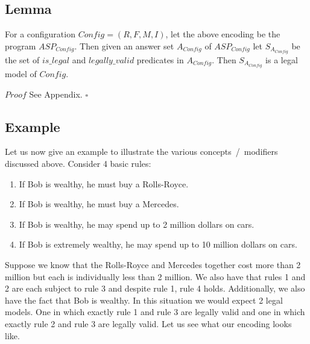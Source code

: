 \subsection{Lemma}

\begin{lemma}\label{lemma:legal_model_of_config}
For a configuration $Config=(R,F,M,I)$, let the above encoding be the program $ASP_{Config}$. Then given an answer set $A_{Config}$ of $ASP_{Config}$ let $S_{A_{Config}}$ be the set of $is\_legal$ and $legally\_valid$ predicates in $A_{Config}$. Then $S_{A_{Config}}$ is a legal model of $Config$. 
\end{lemma}
   

$Proof$ See Appendix. $\square$


\subsection{Example}
Let us now give an example to illustrate the various concepts~/~modifiers discussed above.
Consider 4 basic rules:
\begin{enumerate}
  \item If Bob is wealthy, he must buy a Rolls-Royce.
  \item If Bob is wealthy, he must buy a Mercedes.
  \item If Bob is wealthy, he may spend up to 2 million dollars on cars.
  \item If Bob is extremely wealthy, he may spend up to 10 million dollars on cars.
\end{enumerate}
Suppose we know that the Rolls-Royce and Mercedes together cost more
than 2 million but each is individually less than 2 million. We also
have that rules 1 and 2 are each subject to rule 3 and despite rule 1,
rule 4 holds. Additionally, we also have the fact that Bob is
wealthy. In this situation we would expect 2 legal models. One in which
exactly rule 1 and rule 3 are legally valid and one in which exactly
rule 2 and rule 3 are legally valid. Let us see what our encoding
looks like.
